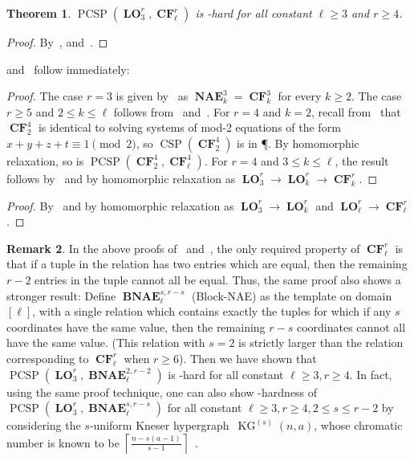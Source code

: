 \documentclass[a4paper,11pt]{article}
\newcommand{\2}{\vec{2}}
\newcommand{\1}{\vec{1}}
\newcommand{\0}{\vec{0}}
\DeclareMathOperator{\KG}{KG}
\DeclareMathOperator{\PCSP}{PCSP}
\DeclareMathOperator{\CSP}{CSP}
\DeclareMathOperator{\NAE}{\mathbf{NAE}}
\DeclareMathOperator{\BNAE}{\mathbf{BNAE}}
\DeclareMathOperator{\CF}{\mathbf{CF}}
\DeclareMathOperator{\LO}{\mathbf{LO}}
\theoremstyle{plain}
\newtheorem{theorem}{Theorem}
\theoremstyle{definition}
\newtheorem{remark}[theorem]{Remark}
\begin{document}
\begin{theorem}\label{locf}
$\PCSP(\LO_3^r, \CF_\ell^r)$ is \NP-hard for all constant $\ell \geq 3$ and $r\geq 4$.
\end{theorem}
\begin{proof}
  By~,  and~.
\end{proof}
 and~ follow immediately:
\cf*
\begin{proof}
The case $r=3$ is given by~ as $\NAE^3_k=\CF^3_k$ for every $k\geq 2$.
The case $r\geq 5$ and $2\leq k\leq\ell$ follows from~ and~.
For $r=4$ and $k=2$, recall from~ that $\CF_2^4$ is identical to
  solving systems of mod-2 equations of the form $x + y + z + t \equiv 1 \pmod
  2$, so $\CSP(\CF_2^4)$ is in \P{}. By homomorphic relaxation, so is
  $\PCSP(\CF_2^4, \CF_\ell^4)$.
For $r=4$ and $3\leq k\leq\ell$, the result follows by~ and by homomorphic relaxation as $\LO_3^r\to\LO_k^r\to \CF_k^r$.
\end{proof}
    
\lo*

\begin{proof}
By~ and by homomorphic relaxation as $\LO_3^r\to\LO_k^r$ and $\LO_\ell^r\to\CF_\ell^r$.
\end{proof}
\begin{remark}
    In the above proofs of~ and~, the only required property of $\CF_\ell^r$ is that if a tuple in the relation has two entries which are equal, then the remaining $r-2$ entries in the tuple cannot all be equal. Thus, the same proof also shows a stronger result: 
Define $\BNAE_\ell^{s,r-s}$ 
    (Block-NAE) as the template on domain $[\ell]$, with a single relation which contains exactly the tuples for which if any $s$ coordinates have the same value, then the remaining $r-s$ coordinates cannot all have the same value. (This relation with $s=2$ is strictly larger than the relation corresponding to $\CF_\ell^r$ when $r \geq 6$). Then we have shown that $\PCSP(\LO_3^r, \BNAE_\ell^{2,r-2})$ is \NP-hard for all constant $\ell \geq 3, r\geq 4$. 
In fact, using the same proof technique, one can also show \NP-hardness of $\PCSP(\LO_3^r, \BNAE_\ell^{s,r-s})$ for all constant $\ell \geq 3, r\geq 4, 2\leq s \leq r-2$ by considering the $s$-uniform Kneser hypergraph~$\KG^{(s)}(n,a)$, whose chromatic number is known to be  $\left\lceil\frac{n-s(a-1)}{s-1}\right\rceil$~\cite{AFL86}.
\end{remark}

{\small


}
\end{document}
